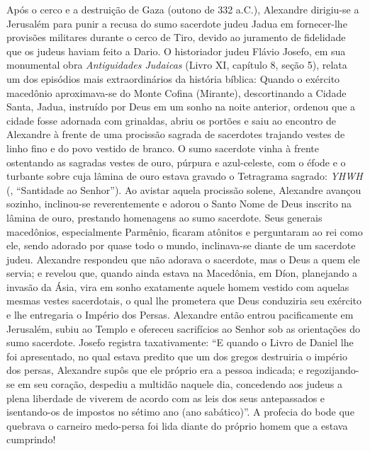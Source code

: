 \documentclass[11pt,a4paper,openany]{book}
\begin{document}
Após o cerco e a destruição de Gaza (outono de 332 a.C.), Alexandre dirigiu-se a Jerusalém para punir a recusa do sumo sacerdote judeu Jadua em fornecer-lhe provisões militares durante o cerco de Tiro, devido ao juramento de fidelidade que os judeus haviam feito a Dario.
O historiador judeu Flávio Josefo, em sua monumental obra \textit{Antiguidades Judaicas} (Livro XI, capítulo 8, seção 5), relata um dos episódios mais extraordinários da história bíblica:
Quando o exército macedônio aproximava-se do Monte Cofina (Mirante), descortinando a Cidade Santa, Jadua, instruído por Deus em um sonho na noite anterior, ordenou que a cidade fosse adornada com grinaldas, abriu os portões e saiu ao encontro de Alexandre à frente de uma procissão sagrada de sacerdotes trajando vestes de linho fino e do povo vestido de branco. O sumo sacerdote vinha à frente ostentando as sagradas vestes de ouro, púrpura e azul-celeste, com o éfode e o turbante sobre cuja lâmina de ouro estava gravado o Tetragrama sagrado: \textit{YHWH} (, ``Santidade ao Senhor'').
Ao avistar aquela procissão solene, Alexandre avançou sozinho, inclinou-se reverentemente e adorou o Santo Nome de Deus inscrito na lâmina de ouro, prestando homenagens ao sumo sacerdote. Seus generais macedônios, especialmente Parmênio, ficaram atônitos e perguntaram ao rei como ele, sendo adorado por quase todo o mundo, inclinava-se diante de um sacerdote judeu. Alexandre respondeu que não adorava o sacerdote, mas o Deus a quem ele servia; e revelou que, quando ainda estava na Macedônia, em Díon, planejando a invasão da Ásia, vira em sonho exatamente aquele homem vestido com aquelas mesmas vestes sacerdotais, o qual lhe prometera que Deus conduziria seu exército e lhe entregaria o Império dos Persas.
Alexandre então entrou pacificamente em Jerusalém, subiu ao Templo e ofereceu sacrifícios ao Senhor sob as orientações do sumo sacerdote. Josefo registra taxativamente: ``E quando o Livro de Daniel lhe foi apresentado, no qual estava predito que um dos gregos destruiria o império dos persas, Alexandre supôs que ele próprio era a pessoa indicada; e regozijando-se em seu coração, despediu a multidão naquele dia, concedendo aos judeus a plena liberdade de viverem de acordo com as leis dos seus antepassados e isentando-os de impostos no sétimo ano (ano sabático)''. A profecia do bode que quebrava o carneiro medo-persa foi lida diante do próprio homem que a estava cumprindo!
\end{document}
